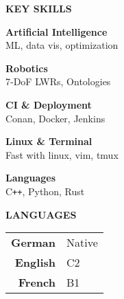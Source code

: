 \documentclass[a4paper, 10pt]{article}
\begin{document}
\begin{tcbraster}[raster columns=7]
\begin{tcolorbox}[left=4pt, right=4pt, top=4pt, height=1.0\textheight, colback=sidebar, boxrule=0.5pt, arc=8pt, frame empty, raster multicolumn=2, nobeforeafter]
    \vspace{4mm}
    \begin{center}
        {\textbf{KEY SKILLS}} \\
    \end{center}

    \begin{keyskills}
        \item \textbf{Artificial Intelligence}\\ ML, data vis, optimization
        \item \textbf{Robotics}\\ 7-DoF LWRs, Ontologies
        \item \textbf{CI \& Deployment}\\ Conan, Docker, Jenkins
        \item \textbf{Linux \& Terminal}\\ Fast with linux, vim, tmux
        \item \textbf{Languages}\\ C{}\verb|++|, Python, Rust
    \end{keyskills}

    \vspace{8mm}
    \begin{center}
        {\textbf{LANGUAGES}} \\
    \end{center}
    \begin{center}
        \begin{tabular}[c]{rl}
            \textbf{German} & Native \\
            \textbf{English} & C2 \\
            \textbf{French} & B1 \\
        \end{tabular}
    \end{center}


\end{tcolorbox}
\begin{tcolorbox}[left=1cm, height=1.0\textheight, colback=white, raster multicolumn=5, boxrule=0pt, frame empty, nobeforeafter]

\end{tcolorbox}
\end{tcbraster}
\end{document}
